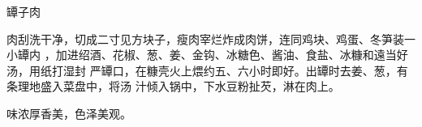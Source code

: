\begin{recipe}{罈子肉}

\ingredients


\cooking

肉刮洗干净，切成二寸见方块子，瘦肉宰烂炸成肉饼，连同鸡块、鸡蛋、冬笋装一小罈内
，加进绍酒、花椒、葱、姜、金钩、冰糖色、酱油、食盐、冰糠和遠当好汤，用纸打湿封
严罈口，在糠壳火上煨约五、六小时即好。出罈时去姜、葱，有条理地盛入菜盘中，将汤
汁倾入锅中，下水豆粉扯芡，淋在肉上。

\features

味浓厚香美，色泽美观。

\end{recipe}

